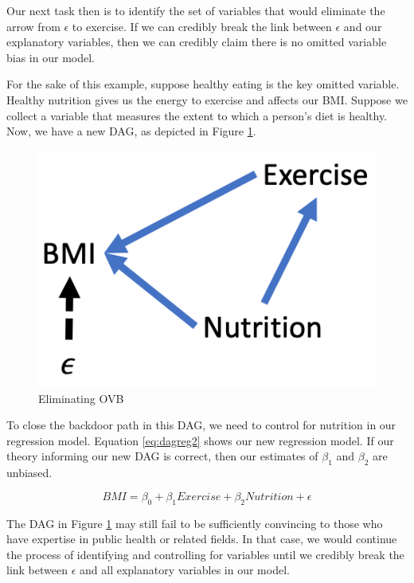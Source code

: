 \documentclass[
]{book}
\begin{document}
Our next task then is to identify the set of variables that would eliminate the arrow from \(\epsilon\) to exercise. If we can credibly break the link between \(\epsilon\) and our explanatory variables, then we can credibly claim there is no omitted variable bias in our model.

For the sake of this example, suppose healthy eating is the key omitted variable. Healthy nutrition gives us the energy to exercise and affects our BMI. Suppose we collect a variable that measures the extent to which a person's diet is healthy. Now, we have a new DAG, as depicted in Figure \ref{fig:dagregnut}.

\begin{figure}

{\centering \includegraphics[width=\textwidth]{images/dag_regnut} 

}

\caption{Eliminating OVB}\label{fig:dagregnut}
\end{figure}

To close the backdoor path in this DAG, we need to control for nutrition in our regression model. Equation \eqref{eq:dagreg2} shows our new regression model. If our theory informing our new DAG is correct, then our estimates of \(\beta_1\) and \(\beta_2\) are unbiased.

\begin{equation}
BMI = \beta_0 + \beta_1Exercise + \beta_2Nutrition + \epsilon
\label{eq:dagreg2}
\end{equation}

The DAG in Figure \ref{fig:dagregnut} may still fail to be sufficiently convincing to those who have expertise in public health or related fields. In that case, we would continue the process of identifying and controlling for variables until we credibly break the link between \(\epsilon\) and all explanatory variables in our model.
\end{document}
